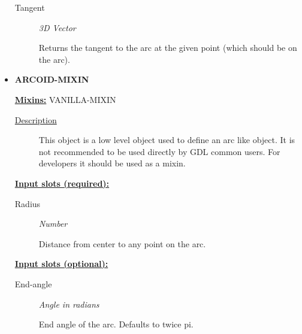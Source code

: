 \documentclass [11pt]{book}
\begin{document}
\begin{itemize}
\begin{description}
\item [Tangent]
\emph{3D Vector}

 Returns the tangent to the arc at the given point (which should be on the arc).




\end{description}







\item {}
\textbf{ARCOID-MIXIN}


\textbf{
\underline{Mixins:}} VANILLA-MIXIN





\begin{description}

\item [
\underline{Description}]


This object is a low level object used to define 
an arc like object. It is not recommended to be used directly by GDL common users. 
For developers it should be used as a mixin.



\end{description}








\textbf{
\underline{Input slots (required):}}

\begin{description}

\item [Radius]
\emph{Number}

 Distance from center to any point on the arc.




\end{description}






\textbf{
\underline{Input slots (optional):}}

\begin{description}

\item [End-angle]
\emph{Angle in radians}

 End angle of the arc. Defaults to twice pi.





\end{description}
\end{itemize}
\end{document}
